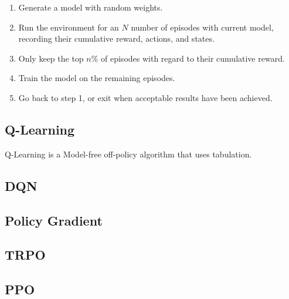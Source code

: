 \begin{enumerate}[label=Step \arabic*:, itemsep=0mm]
	\item Generate a model with random weights.
	\item Run the environment for an $N$ number of episodes with current model, recording their cumulative reward, actions, and states.
	\item Only keep the top $n$\% of episodes with regard to their cumulative reward.
	\item Train the model on the remaining episodes.
	\item Go back to step 1, or exit when acceptable results have been achieved.
\end{enumerate}

\subsection{Q-Learning}

Q-Learning is a Model-free off-policy algorithm that uses tabulation.

\subsection{DQN}

\subsection{Policy Gradient}

\subsection{TRPO}

\subsection{PPO}
